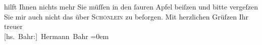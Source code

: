 \begin{ledgroupsized}[t]{13cm}
               hilft Ihnen nichts mehr Sie müſſen in den ſauren Apfel beiſzen und bitte vergeſzen
               Sie mir auch nicht das \label{K_L00278_1v}\label{K_L00278_1h} über \textsc{Schönlein} zu beſorgen.\pend
           \pstart
           Mit herzlichen Grüſzen Ihr treuer{\\[\baselineskip]}\spacefill\mbox{{[}hs. Bahr:{]} Hermann Bahr}\pend
           \leftskip=0em{}\endnumbering{}\end{ledgroupsized}  \newcommand{\dateiname}{L00278}\newcommand{\titel}{Hermann Bahr an Arthur Schnitzler, 3. 11. 1893}\newcommand{\editorInnen}{ Kurt Ifkovits,  Martin Anton Müller}
      
